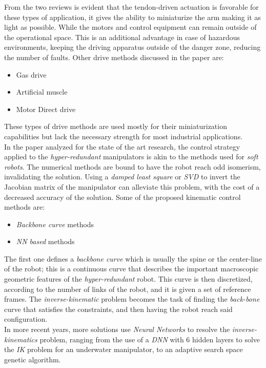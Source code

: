 \noindent
From the two reviews is evident that the tendon-driven actuation is favorable for these types of application, it gives the ability to miniaturize the arm making it as light as possible. While the motors and control equipment can remain outside of the operational space. This is an additional advantage in case of hazardous environments, keeping the driving apparatus outside of the danger zone, reducing the number of faults.
Other drive methods discussed in the paper are:
\begin{itemize}
	\item Gas drive
	\item Artificial muscle
	\item Motor Direct drive
\end{itemize}
These types of drive methods are used mostly for their miniaturization capabilities but lack the necessary strength for most industrial applications.\\
\noindent
In the paper analyzed for the state of the art research, the control strategy applied to the \textit{hyper-redundant} manipulators is akin to the methods used for \textit{soft robots}. The numerical methods are bound to have the robot reach odd isomerism, invalidating the solution. Using a \textit{damped least square} or \textit{SVD} to invert the Jacobian matrix of the manipulator can alleviate this problem, with the cost of a decreased accuracy of the solution.
Some of the proposed kinematic control methods are:
\begin{itemize}
	\item \textit{Backbone curve} methods
	\item \textit{NN based} methods
\end{itemize}
\noindent
The first one defines a \textit{backbone curve} which is usually the spine or the center-line of the robot; this is a continuous curve that describes the important macroscopic geometric features of the \textit{hyper-redundant} robot. This curve is then discretized, according to the number of links of the robot, and it is given a set of reference frames. The \textit{inverse-kinematic} problem becomes the task of finding the \textit{back-bone} curve that satisfies the constraints, and then having the robot reach said configuration. \\
\noindent
In more recent years, more solutions use \textit{Neural Networks} to resolve the \textit{inverse-kinematics} problem, ranging from the use of a \textit{DNN} with $6$ hidden layers to solve the \textit{IK} problem for an underwater manipulator, to an adaptive search space genetic algorithm.



